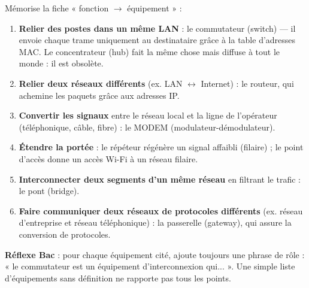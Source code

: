 \documentclass[11pt]{article}
\newcommand{\cle}[1]{{\popxbold\color{popdark}#1}}
\begin{document}
\begin{methode}
Mémorise la fiche « fonction $\rightarrow$ équipement » :
\begin{enumerate}
\item \textbf{Relier des postes dans un même LAN} : le \cle{commutateur} (switch) — il envoie chaque trame uniquement au destinataire grâce à la table d'adresses MAC. Le \cle{concentrateur} (hub) fait la même chose mais diffuse à tout le monde : il est obsolète.
\item \textbf{Relier deux réseaux différents} (ex. LAN $\leftrightarrow$ Internet) : le \cle{routeur}, qui achemine les paquets grâce aux adresses IP.
\item \textbf{Convertir les signaux} entre le réseau local et la ligne de l'opérateur (téléphonique, câble, fibre) : le \cle{MODEM} (modulateur-démodulateur).
\item \textbf{Étendre la portée} : le \cle{répéteur} régénère un signal affaibli (filaire) ; le \cle{point d'accès} donne un accès Wi-Fi à un réseau filaire.
\item \textbf{Interconnecter deux segments d'un même réseau} en filtrant le trafic : le \cle{pont} (bridge).
\item \textbf{Faire communiquer deux réseaux de protocoles différents} (ex. réseau d'entreprise et réseau téléphonique) : la \cle{passerelle} (gateway), qui assure la conversion de protocoles.
\end{enumerate}
\textbf{Réflexe Bac} : pour chaque équipement cité, ajoute toujours une phrase de rôle : « le commutateur est un équipement d'interconnexion qui... ». Une simple liste d'équipements sans définition ne rapporte pas tous les points.
\end{methode}
\end{document}
